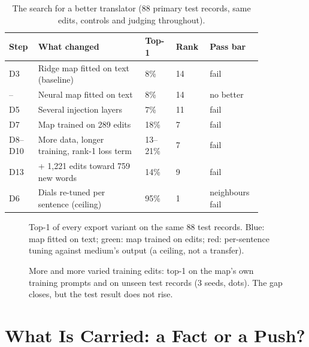\begin{table}[t]
\centering\small
\caption{The search for a better translator (88 primary test records, same edits, controls and judging throughout).}\label{tab:ladder}
\begin{tabular}{|p{0.07\linewidth}|p{0.38\linewidth}|p{0.11\linewidth}|p{0.11\linewidth}|p{0.17\linewidth}|}
\hline
\textbf{Step} & \textbf{What changed} & \textbf{Top-1} & \textbf{Rank} & \textbf{Pass bar}\\ \hline
D3 & Ridge map fitted on text (baseline) & 8\% & 14 & fail\\ \hline
-- & Neural map fitted on text & 8\% & 14 & no better\\ \hline
D5 & Several injection layers & 7\% & 11 & fail\\ \hline
D7 & Map trained on 289 edits & 18\% & 7 & fail\\ \hline
D8--D10 & More data, longer training, rank-1 loss term & 13--21\% & 7 & fail\\ \hline
D13 & + 1,221 edits toward 759 new words & 14\% & 9 & fail\\ \hline
D6 & Dials re-tuned per sentence (ceiling) & 95\% & 1 & neighbours fail\\ \hline
\end{tabular}
\end{table}

\begin{figure}[t]
\centering
{}
\caption{Top-1 of every export variant on the same 88 test records. Blue: map fitted on text; green: map trained on edits; red: per-sentence tuning against medium's output (a ceiling, not a transfer).}\label{fig:ladder}
\end{figure}

\begin{figure}[t]
\centering
{}
\caption{More and more varied training edits: top-1 on the map's own training prompts and on unseen test records (3 seeds, dots). The gap closes, but the test result does not rise.}\label{fig:gap}
\end{figure}

\section{What Is Carried: a Fact or a Push?}\label{sec:push}

